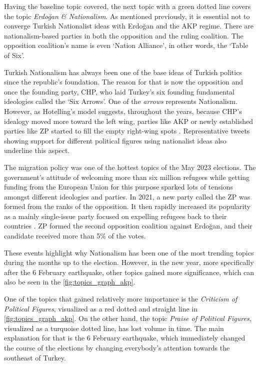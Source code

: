 Having the baseline topic covered, the next topic with a green dotted line covers the topic 
\textit{Erdoğan \& Nationalism}. As mentioned previously, it is essential not to converge Turkish 
Nationalist ideas with Erdoğan and the AKP regime. There are nationalism-based parties in both the 
opposition and the ruling coalition. The opposition coalition's name is even `Nation Alliance', 
in other words, the `Table of Six'.

Turkish Nationalism has always been one of the base ideas of Turkish politics since the republic's 
foundation. The reason for that is now the opposition and once the founding party, \ac{CHP}, who laid 
Turkey's six founding fundamental ideologies called the `Six Arrows'. 
One of the \textit{arrows} represents Nationalism. However, as Hotelling's model suggests, 
throughout the years, because CHP's idealogy moved more toward the left wing, parties like AKP or 
newly established parties like ZP started to fill the empty right-wing spots \parencite{caramani_comparative_politics_2020}. 
Representative tweets showing support for different political figures using nationalist 
ideas also underline this aspect. 

The migration policy was one of the hottest topics of the May 2023 elections. 
The government's attitude of welcoming more than six million refugees while getting funding from the 
European Union for this purpose sparked lots of tensions amongst different ideologies and parties. 
In 2021, a new party called the \ac{ZP} was formed from the ranks of the opposition. 
It then rapidly increased its popularity as a mainly single-issue party focused on expelling refugees 
back to their countries \parencite{berk_esen_turkish_politics_2023}. \ac{ZP} formed the second opposition 
coalition against Erdoğan, and their candidate received more than 5\% of the votes. 

These events highlight why Nationalism has been one of the most trending topics during the months up 
to the election. However, in the new year, more specifically after the 6 February earthquake, other 
topics gained more significance, which can also be seen in the \autoref{fig:topics_graph_akp}.

One of the topics that gained relatively more importance is the \textit{Criticism of Political Figures}, 
visualized as a red dotted and straight line in \autoref{fig:topics_graph_akp}. On the other hand, 
the topic \textit{Praise of Political Figures}, visualized as a turquoise dotted line, has lost volume 
in time. The main explanation for that is the 6 February earthquake, which immediately changed 
the course of the elections by changing everybody's attention towards the southeast of Turkey. 

